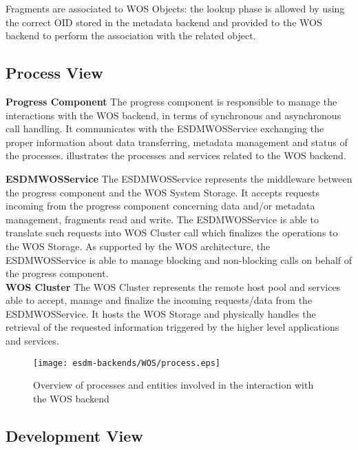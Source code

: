 Fragments are associated to WOS Objects: the lookup phase is allowed by using the correct OID stored in the metadata backend and provided to the WOS backend to perform the association with the related object. 


\subsection{Process View}

\textbf{Progress Component} The progress component is responsible to manage the interactions with the WOS backend, in terms of synchronous and asynchronous call handling. It communicates with the ESDM\textunderscore WOS\textunderscore Service exchanging the proper information about data transferring, metadata management and status of the processes.
 illustrates the processes and services related to the WOS backend.

\textbf{ESDM\textunderscore WOS\textunderscore Service} The ESDM\textunderscore WOS\textunderscore Service represents the middleware between the progress component and the WOS System Storage. It accepts requests incoming from the progress component concerning data and/or metadata management, fragments read and write. The ESDM\textunderscore WOS\textunderscore Service is able to translate such requests into WOS Cluster call which finalizes the operations to the WOS Storage. As supported by the WOS architecture, the ESDM\textunderscore WOS\textunderscore Service is able to manage blocking and non-blocking calls on behalf of the progress component.\\

\textbf{WOS Cluster} The WOS Cluster represents the remote host pool and services able to accept, manage and finalize the incoming requests/data from the ESDM\textunderscore WOS\textunderscore Service. It hosts the WOS Storage and physically handles the retrieval of the requested information triggered by the higher level applications and services.

\begin{figure}
	\centering
	\texttt{[image: esdm-backends/WOS/process.eps]}
	\caption{Overview of processes and entities involved in the interaction with the WOS backend}
	\label{fig:WOS backend process view}
\end{figure}


\subsection{Development View}

